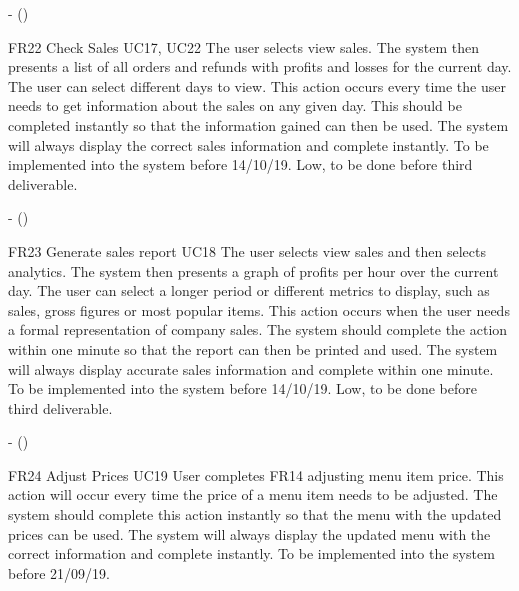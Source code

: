 \noindent \textbf{} -  ()\\
\begin{small}
	
\end{small}
\linebreak

FR22
Check Sales
UC17,
UC22
The user selects view sales. The system then presents a list of all orders and refunds with profits and losses for the current day. The user can select different days to view. This action occurs every time the user needs to get information about the sales on any given day. This should be completed instantly so that the information gained can then be used. The system will always display the correct sales information and complete instantly. To be implemented into the system before 14/10/19. 
Low, to be done before third deliverable.

\noindent \textbf{} -  ()\\
\begin{small}
	
\end{small}
\linebreak

FR23
Generate sales report
UC18
The user selects view sales and then selects analytics. The system then presents a graph of profits per hour over the current day. The user can select a longer period or different metrics to display, such as sales, gross figures or most popular items. This action occurs when the user needs a formal representation of company sales. The system should complete the action within one minute so that the report can then be printed and used. The system will always display accurate sales information and complete within one minute. To be implemented into the system before 14/10/19.
Low, to be done before third deliverable.

\noindent \textbf{} -  ()\\
\begin{small}
	
\end{small}
\linebreak

FR24
Adjust Prices
UC19
User completes FR14 adjusting menu item price. This action will occur every time the price of a menu item needs to be adjusted. The system should complete this action instantly so that the menu with the updated prices can be used. The system will always display the updated menu with the correct information and complete instantly. To be implemented into the system before 21/09/19.


